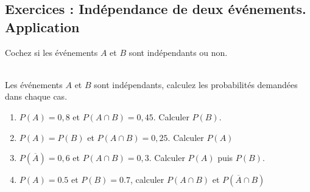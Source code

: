 \documentclass[main.tex]{subfiles}
\begin{document}

\newpage 
{}  
\pagestyle{scrheadings} %
\onehalfspacing
\subsection{Exercices : Indépendance de deux événements. Application}

\begin{exercise}\label{chapter02:exercise:C01} Cochez si les événements $A$ et $B$ sont indépendants ou non.
	
	\noindent{} 
\end{exercise} \smallskip
\begin{exercise}\label{chapter02:exercise:C02}\hfill \\ Les événements $A$ et $B$ sont indépendants, calculez les probabilités demandées dans chaque cas.
	\begin{enumerate}[leftmargin=*,label=\arabic*)]
		\item $P(A)=0,8$ et $P(A \cap B)=0,45$. Calculer $P(B)$.
		\item $P(A)=P(B)$ et $P(A \cap B)=0,25$. Calculer $P(A)$
		\item $P(\overline{A})=0,6$ et $P(A \cap B)=0,3$. Calculer $P(A)$ puis $P(B)$.
		\item $P(A)=0.5$ et $P(B)=0.7$, calculer $P(A\cap B)$ et $P(\overline{A} \cap B)$
	\end{enumerate} 
\end{exercise}
\end{document}
